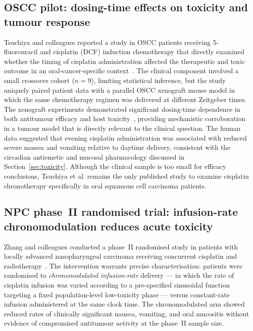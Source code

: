 \documentclass[preprint,review,12pt]{elsarticle}
\begin{document}
\subsection{OSCC pilot: dosing-time effects on toxicity and tumour response}

Tsuchiya and colleagues reported a study in OSCC patients receiving
5-fluorouracil and cisplatin (DCF) induction chemotherapy that directly
examined whether the timing of cisplatin administration affected the
therapeutic and toxic outcome in an oral-cancer-specific
context~\cite{Tsuchiya2018}.  The clinical component involved a small
crossover cohort ($n = 9$), limiting statistical inference, but the
study uniquely paired patient data with a parallel OSCC xenograft
mouse model in which the same chemotherapy regimen was delivered at
different Zeitgeber times.  The xenograft experiments demonstrated
significant dosing-time dependence in both antitumour efficacy and
host toxicity~\cite{Tsuchiya2018}, providing mechanistic corroboration
in a tumour model that is directly relevant to the clinical question.
The human data suggested that evening cisplatin administration was
associated with reduced severe nausea and vomiting relative to daytime
delivery, consistent with the circadian antiemetic and mucosal
pharmacology discussed in Section~\ref{sec:toxicity}.  Although the
clinical sample is too small for efficacy conclusions, Tsuchiya et al.
remains the only published study to examine cisplatin chronotherapy
specifically in oral squamous cell carcinoma patients.

\subsection{NPC phase~II randomised trial: infusion-rate chronomodulation
  reduces acute toxicity}

Zhang and colleagues conducted a phase~II randomised study in patients
with locally advanced nasopharyngeal carcinoma receiving concurrent
cisplatin and radiotherapy~\cite{Zhang2018}.  The intervention warrants
precise characterisation: patients were randomised to \emph{chronomodulated
infusion-rate} delivery --- in which the rate of cisplatin infusion was
varied according to a pre-specified sinusoidal function targeting a fixed
population-level low-toxicity phase --- versus constant-rate infusion
administered at the same clock time.  The chronomodulated arm showed
reduced rates of clinically significant nausea, vomiting, and oral
mucositis without evidence of compromised antitumour activity at the
phase~II sample size.
\end{document}
